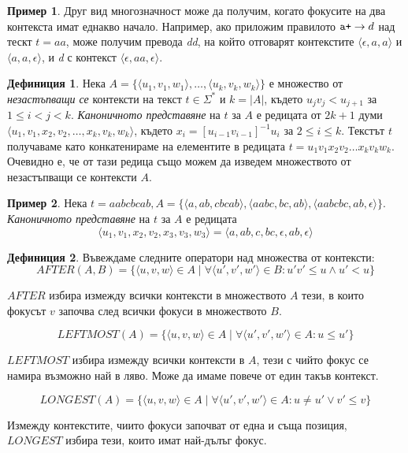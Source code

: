 \documentclass[12pt, oneside]{article}
\theoremstyle{definition}
\newtheorem{definition}{Дефиниция}[section]
\newtheorem{example}{Пример}[section]
\begin{document}
\begin{example}
	Друг вид многозначност може да получим, когато фокусите на два контекста имат еднакво начало. Например, ако приложим правилото \( \verb/a+/ \to d \) над тескт \( t = aa \), може получим превода \emph{dd}, на който отговарят контекстите \( \langle \epsilon, a, a \rangle \) и \( \langle a, a, \epsilon \rangle \), и \emph{d} с контекст \( \langle \epsilon, aa, \epsilon \rangle \).
\end{example}

\begin{definition}
	Нека \(A = \{ \langle u_1, v_1, w_1 \rangle, \dots , \langle u_k, v_k, w_k \rangle \}\) е множество от \emph{незастъпващи се} контексти на текст \(t \in \Sigma^*\) и \(k = |A|\), където \( u_jv_j < u_{j+1} \) за \( 1 \le i < j < k \). \emph{Каноничното представяне} на \(t\) за \(A\) е редицата от \(2k+1\) думи \( \langle u_1, v_1, x_2, v_2, \dots , x_k, v_k, w_k \rangle \), където \( x_i = [u_{i-1}v_{i-1}]^{-1}u_i \) за \( 2 \le i \le k \). Текстът \(t\) получаваме като конкатенираме на елементите в редицата \(t = u_1v_1x_2v_2 \dots x_kv_kw_k \). Очевидно е, че от тази редица също можем да изведем множеството от незастъпващи се контексти \(A\).
\end{definition}

\begin{example}
	Нека \( t = aabcbcab, A = \{ \langle a, ab, cbcab \rangle, \langle aabc, bc, ab \rangle, \langle aabcbc, ab, \epsilon \rangle \} \). \emph{Каноничното представяне} на \(t\) за \(A\) е редицата
	\[ \langle u_1, v_1, x_2, v_2, x_3, v_3, w_3 \rangle = \langle a, ab, c, bc, \epsilon, ab, \epsilon \rangle \]
\end{example}

\begin{definition}\label{def:LmlOps}
	Въвеждаме следните оператори над множества от контексти:
\[ AFTER(A, B) = \{ \langle u, v, w \rangle \in A \mid \forall \langle u', v', w' \rangle \in B : u'v' \leq u \land u' < u  \} \] 

\( AFTER \) избира измежду всички контексти в множеството \(A\) тези, в които фокусът \(v\) започва след всички фокуси в множеството \(B\).

\[ LEFTMOST(A) = \{ \langle u, v, w \rangle \in A \mid \forall \langle u', v', w' \rangle \in A : u \leq u' \} \]

\( LEFTMOST \) избира измежду всички контексти в \(A\), тези с чийто фокус се намира възможно най в ляво. Може да имаме повече от един такъв контекст.

\[ LONGEST(A) = \{ \langle u, v, w \rangle \in A \mid \forall \langle u', v', w' \rangle \in A : u \neq u' \lor v' \leq v \} \]

Измежду контекстите, чиито фокуси започват от една и съща позиция, \( LONGEST \) избира тези, които имат най-дълъг фокус.
\end{definition}
\end{document}

